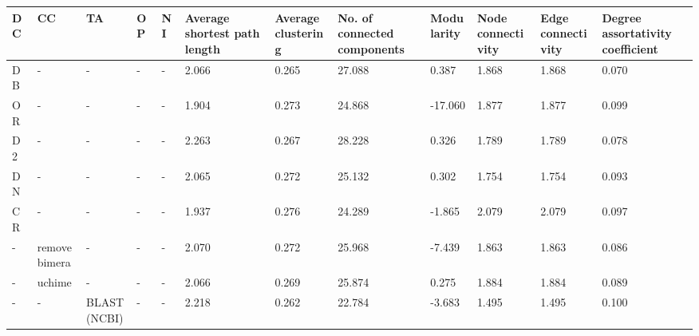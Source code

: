   \begin{table}[]
  \begin{tabular}{|l|l|l|l|l|l|l|l|l|l|l|l|}
  \hline
  DC & CC            & TA                & OP          & NI         & Average shortest path length & Average clustering & No. of connected components & Modularity & Node connectivity & Edge connectivity & Degree assortativity coefficient \\ \hline
  DB & -             & -                 & -           & -          & 2.066                        & 0.265              & 27.088                      & 0.387      & 1.868             & 1.868             & 0.070                            \\
  OR & -             & -                 & -           & -          & 1.904                        & 0.273              & 24.868                      & -17.060    & 1.877             & 1.877             & 0.099                            \\
  D2 & -             & -                 & -           & -          & 2.263                        & 0.267              & 28.228                      & 0.326      & 1.789             & 1.789             & 0.078                            \\
  DN & -             & -                 & -           & -          & 2.065                        & 0.272              & 25.132                      & 0.302      & 1.754             & 1.754             & 0.093                            \\
  CR & -             & -                 & -           & -          & 1.937                        & 0.276              & 24.289                      & -1.865     & 2.079             & 2.079             & 0.097                            \\
  -  & remove bimera & -                 & -           & -          & 2.070                        & 0.272              & 25.968                      & -7.439     & 1.863             & 1.863             & 0.086                            \\
  -  & uchime        & -                 & -           & -          & 2.066                        & 0.269              & 25.874                      & 0.275      & 1.884             & 1.884             & 0.089                            \\
  -  & -             & BLAST(NCBI)       & -           & -          & 2.218                        & 0.262              & 22.784                      & -3.683     & 1.495             & 1.495             & 0.100                            \\

\end{tabular}
\end{table}
